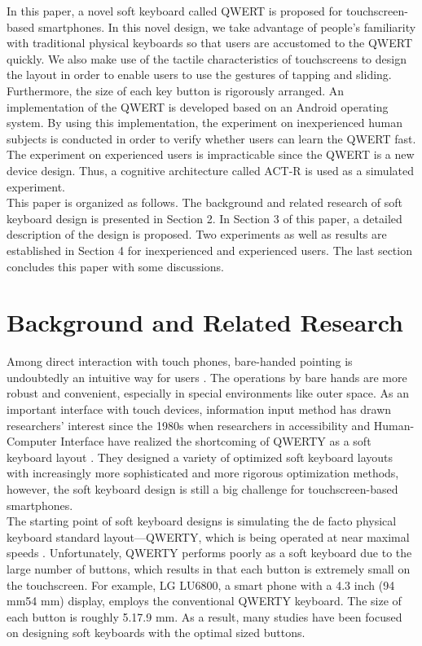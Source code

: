 \documentclass{singlecol-new}
\theoremstyle{TH}{
\newtheorem{lemma}{Lemma}
\newtheorem{theorem}[lemma]{Theorem}
\newtheorem{corrolary}[lemma]{Corrolary}
\newtheorem{conjecture}[lemma]{Conjecture}
\newtheorem{proposition}[lemma]{Proposition}
\newtheorem{claim}[lemma]{Claim}
\newtheorem{stheorem}[lemma]{Wrong Theorem}
\newtheorem{algorithm}{Algorithm}
}
\theoremstyle{THrm}{
\newtheorem{definition}{Definition}[section]
\newtheorem{question}{Question}[section]
\newtheorem{remark}{Remark}
\newtheorem{scheme}{Scheme}
}
\theoremstyle{THhit}{
\newtheorem{case}{Case}[section]
}
\begin{document}
In this paper, a novel soft keyboard called QWERT is proposed for touchscreen-based smartphones. In this novel design, we take advantage of people's familiarity with traditional physical keyboards so that users are accustomed to the QWERT quickly. We also make use of the tactile characteristics of touchscreens to design the layout in order to enable users to use the gestures of tapping and sliding. Furthermore, the size of each key button is rigorously arranged. An implementation of the QWERT is developed based on an Android operating system. By using this implementation, the experiment on inexperienced human subjects is conducted in order to verify whether users can learn the QWERT fast. The experiment on experienced users is impracticable since the QWERT is a new device design. Thus, a cognitive architecture called ACT-R is used as a simulated experiment.  \\

This paper is organized as follows. The background and related research of soft keyboard design is presented in Section 2. In Section 3 of this paper, a detailed description of the design is proposed. Two experiments as well as results are established in Section 4 for inexperienced and experienced users. The last section concludes this paper with some discussions.

\section{Background and Related Research}

Among direct interaction with touch phones, bare-handed pointing is undoubtedly an intuitive way for users \citep{albinsson2003high}. The operations by bare hands are more robust and convenient, especially in special environments like outer space. As an important interface with touch devices, information input method has drawn researchers' interest since the 1980s when researchers in accessibility and Human-Computer Interface have realized the shortcoming of QWERTY as a soft keyboard layout \citep{colle2004standing, park2010touch}. They designed a variety of optimized soft keyboard layouts with increasingly more sophisticated and more rigorous optimization methods, however, the soft keyboard design is still a big challenge for touchscreen-based smartphones. \\

The starting point of soft keyboard designs is simulating the de facto physical keyboard standard layout---QWERTY, which is being operated at near maximal speeds \citep{noyes1983qwerty}. Unfortunately, QWERTY performs poorly as a soft keyboard due to the large number of buttons, which results in that each button is extremely small on the touchscreen. For example, LG LU6800, a smart phone with a 4.3 inch (94 mm54 mm) display, employs the conventional QWERTY keyboard. The size of each button is roughly 5.17.9 mm. As a result, many studies have been focused on designing soft keyboards with the optimal sized buttons. \\
\end{document}
